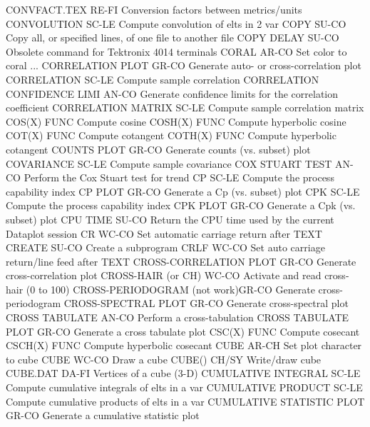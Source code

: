 CONVFACT.TEX                RE-FI Conversion factors between metrics/units
CONVOLUTION                 SC-LE Compute convolution of elts in 2 var
COPY                        SU-CO Copy all, or specified lines, of one file to another file
COPY DELAY                  SU-CO Obsolete command for Tektronix 4014 terminals
CORAL                       AR-CO Set color to coral
... CORRELATION PLOT        GR-CO Generate auto- or cross-correlation plot
CORRELATION                 SC-LE Compute sample correlation
CORRELATION CONFIDENCE LIMI AN-CO Generate confidence limits for the correlation coefficient
CORRELATION MATRIX          SC-LE Compute sample correlation matrix
COS(X)                      FUNC  Compute cosine
COSH(X)                     FUNC  Compute hyperbolic cosine
COT(X)                      FUNC  Compute cotangent
COTH(X)                     FUNC  Compute hyperbolic cotangent
COUNTS PLOT                 GR-CO Generate counts (vs. subset) plot
COVARIANCE                  SC-LE Compute sample covariance
COX STUART TEST             AN-CO Perform the Cox Stuart test for trend
CP                          SC-LE Compute the process capability index
CP PLOT                     GR-CO Generate a Cp (vs. subset) plot
CPK                         SC-LE Compute the process capability index
CPK PLOT                    GR-CO Generate a Cpk (vs. subset) plot
CPU TIME                    SU-CO Return the CPU time used by the current Dataplot session
CR                          WC-CO Set automatic carriage return after TEXT
CREATE                      SU-CO Create a subprogram
CRLF                        WC-CO Set auto carriage return/line feed after TEXT
CROSS-CORRELATION PLOT      GR-CO Generate cross-correlation plot
CROSS-HAIR (or CH)          WC-CO Activate and read cross-hair (0 to 100)
CROSS-PERIODOGRAM (not work)GR-CO Generate cross-periodogram
CROSS-SPECTRAL PLOT         GR-CO Generate cross-spectral plot
CROSS TABULATE              AN-CO Perform a cross-tabulation
CROSS TABULATE PLOT         GR-CO Generate a cross tabulate plot
CSC(X)                      FUNC  Compute cosecant
CSCH(X)                     FUNC  Compute hyperbolic cosecant
CUBE                        AR-CH Set plot character to cube
CUBE                        WC-CO Draw a cube
CUBE()                      CH/SY Write/draw cube
CUBE.DAT                    DA-FI Vertices of a cube (3-D)
CUMULATIVE INTEGRAL         SC-LE Compute cumulative integrals of elts in a var
CUMULATIVE PRODUCT          SC-LE Compute cumulative products of elts in a var
CUMULATIVE STATISTIC PLOT   GR-CO Generate a cumulative statistic plot
